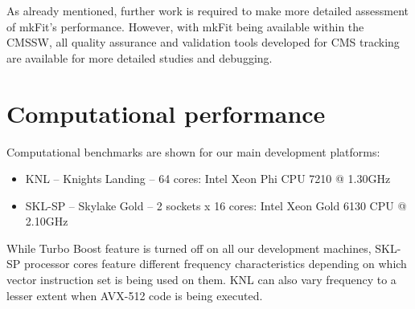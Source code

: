\documentclass{webofc}
\def\mkfit{mkFit\xspace}
\begin{document}

As already mentioned, further work is required to make more detailed
assessment of \mkfit's performance. However, with \mkfit being available
within the CMSSW, all quality assurance and validation tools developed for CMS
tracking are available for more detailed studies and debugging.



\section{Computational performance}
\label{sec:comp-perf}


Computational benchmarks are shown for our main development platforms:

\begin{itemize}

\item KNL -- Knights Landing -- 64 cores: Intel Xeon Phi CPU 7210 @ 1.30GHz

\item SKL-SP -- Skylake Gold -- 2 sockets x 16 cores: Intel Xeon Gold 6130 CPU @ 2.10GHz

\end{itemize}

While Turbo Boost feature is turned off on all our development machines,
SKL-SP processor cores feature different frequency characteristics depending
on which vector instruction set is being used on them. KNL can also vary
frequency to a lesser extent when AVX-512 code is being executed.
\end{document}
